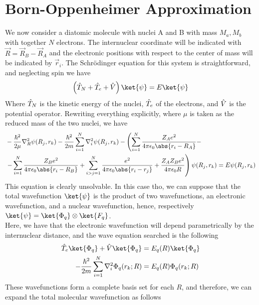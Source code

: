 \documentclass[../qm.tex]{subfiles}
\begin{document}
	\section{Born-Oppenheimer Approximation}
	We now consider a diatomic molecule with nuclei A and B with mass $M_a,M_b$ with together $N$ electrons. The internuclear coordinate will be indicated with $\vec{R}=\vec{R}_B-\vec{R}_A$ and the electronic positions with respect to the center of mass will be indicated by $\vec{r}_i$. The Schrödinger equation for this system is straightforward, and neglecting spin we have
	\begin{equation}
		\left( \opr{T}_N+\opr{T}_e+\opr{V} \right)\ket{\psi}=E\ket{\psi}
		\label{eq:diatomicmolhamiltonian}
	\end{equation}
	Where $\hat{T}_N$ is the kinetic energy of the nuclei, $\hat{T}_e$ of the electrons, and $\hat{V}$ is the potential operator. Rewriting everything explicitly, where $\mu$ is taken as the reduced mass of the two nuclei, we have
	\begin{equation}
		\begin{aligned}
			&-\frac{\hbar^2}{2\mu}\nabla_R^2\psi(R_j,r_k)-\frac{\hbar^2}{2m}\sum_{i=1}^N\nabla_i^2\psi(R_j,r_k)-\left(\sum_{i=1}^N\frac{Z_Ae^2}{4\pi\epsilon_0\abs{r_i-R_A}}-\right.\\
		&\left.-\sum_{i=1}^N\frac{Z_Be^2}{4\pi\epsilon_0\abs{r_i-R_B}}+\sum_{i>j=1}^N\frac{e^2}{4\pi\epsilon_0\abs{r_i-r_j}}+\frac{Z_AZ_Be^2}{4\pi\epsilon_0R}\right)\psi(R_j,r_k)=E\psi(R_j,r_k)
		\end{aligned}
		\label{eq:diatomicmolschrcomp}
	\end{equation}
	This equation is clearly unsolvable. In this case tho, we can suppose that the total wavefunction $\ket{\psi}$ is the product of two wavefunctions, an electronic wavefunction, and a nuclear wavefunction, hence, respectively $\ket{\psi}=\ket{\Phi_q}\otimes\ket{F_q}$.\\
	Here, we have that the electronic wavefunction will depend parametrically by the internuclear distance, and the wave equation searched is the following
	\begin{equation}
		\begin{aligned}
			\opr{T}_e\ket{\Phi_q}+\opr{V}\ket{\Phi_q}&=E_q(R)\ket{\Phi_q}\\
			-\frac{\hbar^2}{2m}\sum_{i=1}^N\nabla^2_i\Phi_q(r_k;R)&=E_q(R)\Phi_q(r_k;R)
		\end{aligned}
		\label{eq:electronicequationdiamol}
	\end{equation}
	These wavefunctions form a complete basis set for each $R$, and therefore, we can expand the total molecular wavefunction as follows
\end{document}
